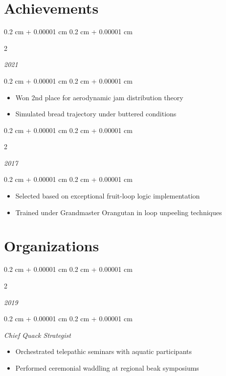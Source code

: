 \documentclass[10pt, letterpaper]{article}
\newenvironment{highlights}{
    \begin{itemize}[
        topsep=0.10 cm,
        parsep=0.10 cm,
        partopsep=0pt,
        itemsep=0pt,
        leftmargin=0.4 cm + 10pt
    ]
}{
    \end{itemize}
}
\newenvironment{onecolentry}{
    \begin{adjustwidth}{
        0.2 cm + 0.00001 cm
    }{
        0.2 cm + 0.00001 cm
    }
}{
    \end{adjustwidth}
}
\newenvironment{twocolentry}[2][]{
    \onecolentry
    \def\secondColumn{#2}
    \setcolumnwidth{\fill, 4.5 cm}
    \begin{paracol}{2}
}{
    \switchcolumn \raggedleft \secondColumn
    \end{paracol}
    \endonecolentry
}
\begin{document}
    \vspace{0.05 cm}
    
    \section{Achievements}

    \begin{twocolentry}{
        \textit{2021}}
    \end{twocolentry}
    
    \begin{onecolentry}
        \begin{highlights}
            \item Won 2nd place for aerodynamic jam distribution theory
            \item Simulated bread trajectory under buttered conditions
        \end{highlights}
    \end{onecolentry}
    
    \vspace{0.2 cm}
    
    \begin{twocolentry}{
        \textit{2017}}
    \end{twocolentry}
    
    \begin{onecolentry}
        \begin{highlights}
            \item Selected based on exceptional fruit-loop logic implementation
            \item Trained under Grandmaster Orangutan in loop unpeeling techniques
        \end{highlights}
    \end{onecolentry}
    
    \vspace{0.05 cm}
    
    \section{Organizations}
    
    \begin{twocolentry}{
        \textit{2019}}
    \end{twocolentry}
    
    \begin{onecolentry}
        \textit{Chief Quack Strategist}
        \begin{highlights}
            \item Orchestrated telepathic seminars with aquatic participants
            \item Performed ceremonial waddling at regional beak symposiums
        \end{highlights}
    \end{onecolentry}
    
\end{document}
